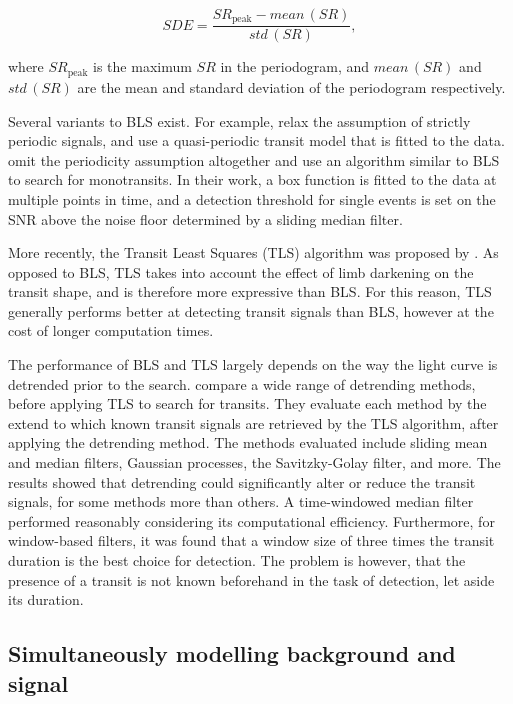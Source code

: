 \begin{equation}
    SDE = \frac{SR_{\text{peak}} - \textit{mean}\,(SR)} {\textit{std}\,(SR)},
\end{equation}

\noindent where $SR_{\text{peak}}$ is the maximum $SR$ in the periodogram, and $\textit{mean}\,(SR)$ and $\textit{std}\,(SR)$ are the mean and standard deviation of the periodogram respectively.

Several variants to BLS exist. For example, \cite{carter2013quasiperiodic} relax the assumption of strictly periodic signals, and use a quasi-periodic transit model that is fitted to the data. \cite{foreman2016population} omit the periodicity assumption altogether and use an algorithm similar to BLS to search for monotransits. In their work, a box function is fitted to the data at multiple points in time, and a detection threshold for single events is set on the SNR above the noise floor determined by a sliding median filter.

More recently, the Transit Least Squares (TLS) algorithm was proposed by \cite{hippke2019optimized}. As opposed to BLS, TLS takes into account the effect of limb darkening on the transit shape, and is therefore more expressive than BLS. For this reason, TLS generally performs better at detecting transit signals than BLS, however at the cost of longer computation times.

The performance of BLS and TLS largely depends on the way the light curve is detrended prior to the search. \cite{hippke2019wotan} compare a wide range of detrending methods, before applying TLS to search for transits. They evaluate each method by the extend to which known transit signals are retrieved by the TLS algorithm, after applying the detrending method. The methods evaluated include sliding mean and median filters, Gaussian processes, the Savitzky-Golay filter, and more. The results showed that detrending could significantly alter or reduce the transit signals, for some methods more than others. A time-windowed median filter performed reasonably considering its computational efficiency. Furthermore, for window-based filters, it was found that a window size of three times the transit duration is the best choice for detection. The problem is however, that the presence of a transit is not known beforehand in the task of detection, let aside its duration.

\subsection{Simultaneously modelling background and signal}

